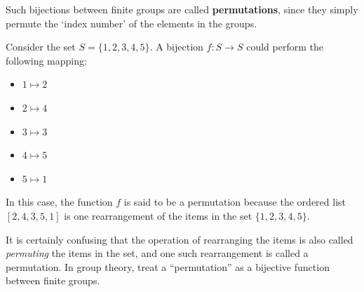 Such bijections between finite groups are called \textbf{permutations}, since they simply permute the `index number' of the elements in the groups.

\begin{example}
    Consider the set $S = \{1, 2, 3, 4, 5\}$. A bijection $f: S \to S$ could perform the following mapping:
    \begin{itemize}
        \item $1 \mapsto 2$
        \item $2 \mapsto 4$
        \item $3 \mapsto 3$
        \item $4 \mapsto 5$
        \item $5 \mapsto 1$
    \end{itemize}
    In this case, the function $f$ is said to be a permutation because the ordered list $[2, 4, 3, 5, 1]$ is one rearrangement of the items in the set $\{1, 2, 3, 4, 5\}$.
\end{example}

\begin{remark}
    It is certainly confusing that the operation of rearranging the items is also called \textit{permuting} the items in the set, and one such rearrangement is called a permutation. In group theory, treat a ``permutation'' as a bijective function between finite groups.
\end{remark}

